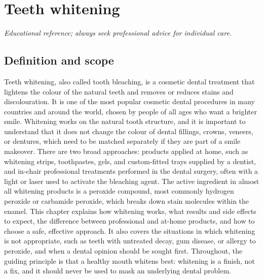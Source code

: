 \chapter{Teeth whitening}

\medskip
\noindent\textit{Educational reference; always seek professional advice for individual care.}

\section*{Definition and scope}
Teeth whitening, also called tooth bleaching, is a cosmetic dental treatment that lightens the colour of the natural teeth and removes or reduces stains and discolouration. It is one of the most popular cosmetic dental procedures in many countries and around the world, chosen by people of all ages who want a brighter smile. Whitening works on the natural tooth structure, and it is important to understand that it does not change the colour of dental fillings, crowns, veneers, or dentures, which need to be matched separately if they are part of a smile makeover. There are two broad approaches: products applied at home, such as whitening strips, toothpastes, gels, and custom-fitted trays supplied by a dentist, and in-chair professional treatments performed in the dental surgery, often with a light or laser used to activate the bleaching agent. The active ingredient in almost all whitening products is a peroxide compound, most commonly hydrogen peroxide or carbamide peroxide, which breaks down stain molecules within the enamel. This chapter explains how whitening works, what results and side effects to expect, the difference between professional and at-home products, and how to choose a safe, effective approach. It also covers the situations in which whitening is not appropriate, such as teeth with untreated decay, gum disease, or allergy to peroxide, and when a dental opinion should be sought first. Throughout, the guiding principle is that a healthy mouth whitens best: whitening is a finish, not a fix, and it should never be used to mask an underlying dental problem.

